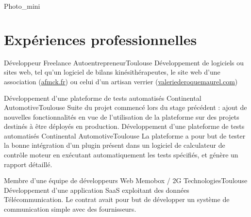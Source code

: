 \documentclass{my_cv_bis}
\begin{document}
 {
}{Photo_mini}

 \vspace{-5mm}
\section{Expériences professionnelles}
	{Développeur Freelance}
	{Autoentrepreneur}{Toulouse}
	{
	Développement de logiciels ou sites web, tel qu'un logiciel de bilans kinésithérapeutes, le site web d'une association (\url{afmck.fr})
	ou celui d'un artisan verrier (\url{valeriederoquemaurel.com})
	}
	{}

	{Développement d'une plateforme de tests automatisés}
	{Continental Automotive}{Toulouse}
	{
	Suite du projet commencé lors du stage précédent : ajout de nouvelles fonctionnalités en vue de l'utilisation
	de la plateforme sur des projets destinés à être déployés en production. 
	}
	{}
	{Développement d'une plateforme de tests automatisés}
	{Continental Automotive}{Toulouse}
	{
	La plateforme a pour but de tester la bonne intégration d'un plugin présent dans un logiciel de calculateur de contrôle moteur en exécutant
	automatiquement les tests spécifiés, et génère un rapport détaillé. 
	}
	{}

	{ Membre d'une équipe de développeurs Web}
	{Memobox / 2G Technologies}{Toulouse}
	{Développement d'une application SaaS exploitant des données Télécommunication. Le contrat avait pour but de développer un système de
	communication simple avec des fournisseurs.} {}
\end{document}

